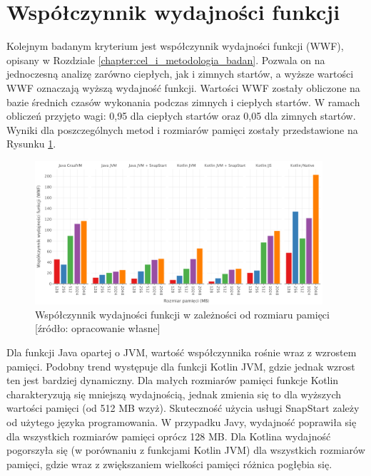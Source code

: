 \newpage
\section{Współczynnik wydajności funkcji}\label{chapter:results_wwf}

Kolejnym badanym kryterium jest współczynnik wydajności funkcji (WWF), opisany w Rozdziale \ref{chapter:cel_i_metodologia_badan}.
Pozwala on na jednoczesną analizę zarówno ciepłych, jak i zimnych startów, a wyższe wartości WWF oznaczają wyższą wydajność funkcji.
Wartości WWF zostały obliczone na bazie średnich czasów wykonania podczas zimnych i ciepłych startów.
W ramach obliczeń przyjęto wagi: 0,95 dla ciepłych startów oraz 0,05 dla zimnych startów.
Wyniki dla poszczególnych metod i rozmiarów pamięci zostały przedstawione na Rysunku \ref{fig:avg_wwf}.

\begin{figure}[h]
    \centering
    \includegraphics[width=0.95\textwidth]{charts/results/wwf.png}
    \caption{Współczynnik wydajności funkcji w zależności od rozmiaru pamięci [źródło: opracowanie własne]}
    \label{fig:avg_wwf}
\end{figure}

Dla funkcji Java opartej o JVM, wartość współczynnika rośnie wraz z wzrostem pamięci.
Podobny trend występuje dla funkcji Kotlin JVM, gdzie jednak wzrost ten jest bardziej dynamiczny.
Dla małych rozmiarów pamięci funkcje Kotlin charakteryzują się mniejszą wydajnością, jednak zmienia się to dla wyższych wartości pamięci (od 512 MB wzyż).
Skuteczność użycia usługi SnapStart zależy od użytego języka programowania.
W przypadku Javy, wydajność poprawiła się dla wszystkich rozmiarów pamięci oprócz 128 MB. 
Dla Kotlina wydajność pogorszyła się (w porównaniu z funkcjami Kotlin JVM) dla wszystkich rozmiarów pamięci, gdzie wraz z zwiększaniem wielkości pamięci różnica pogłębia się.

